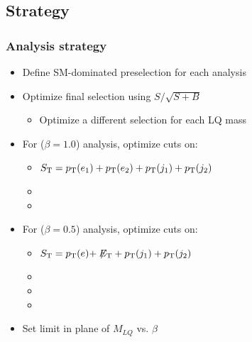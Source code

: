 \documentclass[bigger]{beamer}
\begin{document}
\subsection{Strategy}
\label{sec-1-3}
\begin{frame}
\frametitle{Analysis strategy}
\label{sec-1-3-1}

\begin{itemize}
\item Define SM-dominated preselection for each analysis
\item Optimize final selection using $S/\sqrt{S+B}$
\begin{itemize}
\item Optimize a different selection for each LQ mass
\end{itemize}
\item For \eejj ($\beta = 1.0$) analysis, optimize cuts on:
\begin{itemize}
\item $S_{\text{T}} = p_{\text{T}}(e_1) + p_{\text{T}}(e_2) + p_{\text{T}}(j_1) + p_{\text{T}}(j_2)$
\item \mejmin
\item \mee
\end{itemize}
\item For \enujj ($\beta = 0.5$) analysis, optimize cuts on:
\begin{itemize}
\item $S_{\text{T}} = p_{\text{T}}(e) + \not\!\!{E_{\text{T}}} + p_{\text{T}}(j_1) + p_{\text{T}}(j_2)$
\item \mej
\item \mt
\item \met
\end{itemize}
\item Set limit in plane of $M_{LQ}$ vs. $\beta$
\end{itemize}
\end{frame}
\end{document}
